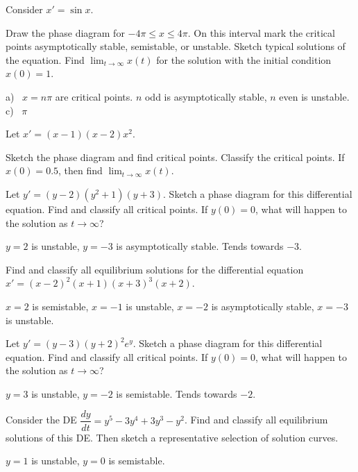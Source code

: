\begin{exercise}
Consider $x' = \sin x$.
\begin{tasks}
\task Draw the phase diagram for $-4\pi \leq x \leq 4\pi$.  On this interval
mark the critical points asymptotically stable, semistable, or unstable.
\task Sketch typical solutions of the equation.
\task Find $\displaystyle \lim_{t\to \infty} x(t)$ for the solution with the initial condition
$x(0) = 1$.
\end{tasks}
\end{exercise}
\comboSol{%
}
{%
a)~ $x = n\pi$ are critical points. $n$ odd is asymptotically stable, $n$ even is unstable. \quad c)~ $\pi$
}

\begin{exercise}\ansMark%
Let $x'=(x-1)(x-2)x^2$.
\begin{tasks}
\task Sketch the phase diagram and find critical
points.
\task Classify the critical points.
\task If $x(0)=0.5$, then find $\displaystyle \lim_{t\to\infty} x(t)$.
\end{tasks}
\end{exercise}

\begin{exercise}
Let $y' = (y-2)(y^2 + 1)(y+3)$. Sketch a phase diagram for this differential equation. Find and classify all critical points. If $y(0) = 0$, what will happen to the solution as $t \rightarrow \infty$?
\end{exercise}
\comboSol{%
}
{%
$y=2$ is unstable, $y=-3$ is asymptotically stable. Tends towards $-3$.
}

\begin{exercise}
Find and classify all equilibrium solutions for the differential equation $x' = (x-2)^2(x+1)(x+3)^3(x+2)$.
\end{exercise}
\comboSol{%
}
{%
$x=2$ is semistable, $x=-1$ is unstable, $x=-2$ is asymptotically stable, $x=-3$ is unstable.
}

\begin{exercise}
Let $y' = (y-3)(y+2)^2e^y$. Sketch a phase diagram for this differential equation. Find and classify all critical points. If $y(0) = 0$, what will happen to the solution as $t \rightarrow \infty$?
\end{exercise}
\comboSol{%
}
{%
$y=3$ is unstable, $y=-2$ is semistable. Tends towards $-2$.
}

\begin{exercise}
Consider the DE $\dfrac{dy}{dt}=y^5-3y^4+3y^3-y^2$. %
Find and classify all equilibrium solutions of this DE. Then sketch a representative selection of solution curves.
\end{exercise}
\comboSol{%
}
{%
$y=1$ is unstable, $y=0$ is semistable.
}

